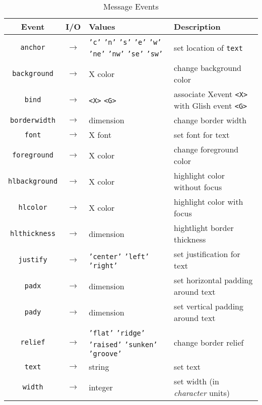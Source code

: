 \begin{table}[tbh]
{\small
\begin{center}
\begin{tabular}{|c|c|p{1.6in}|p{2.1in}|}
\hline
Event & I/O & Values & Description \\
\hline
\hline
{\tt anchor}    &$\rightarrow$& {\tt 'c'} {\tt 'n'} {\tt 's'} {\tt 'e'} {\tt 'w'} {\tt 'ne'} {\tt 'nw'} {\tt 'se'} {\tt 'sw'} & set location of {\tt text} \\ \hline
{\tt background}&$\rightarrow$& X color & change background color \\ \hline
{\tt bind}	&$\rightarrow$&\verb+<X>+ \verb+<G>+& associate Xevent \verb+<X>+ with Glish event \verb+<G>+ \\ \hline
{\tt borderwidth}&$\rightarrow$& dimension & change border width \\ \hline
{\tt font}	&$\rightarrow$& X font & set font for text \\ \hline
{\tt foreground}&$\rightarrow$& X color & change foreground color \\ \hline
{\tt hlbackground}&$\rightarrow$& X color & highlight color without focus \\ \hline
{\tt hlcolor}	&$\rightarrow$& X color & highlight color with focus \\ \hline
{\tt hlthickness}&$\rightarrow$& dimension & hightlight border thickness \\ \hline
{\tt justify}	&$\rightarrow$& {\tt 'center'} {\tt 'left'} {\tt 'right'} & set justification for text \\ \hline
{\tt padx}	&$\rightarrow$& dimension & set horizontal padding around text \\ \hline
{\tt pady}	&$\rightarrow$& dimension & set vertical padding around text \\ \hline
{\tt relief}	&$\rightarrow$& {\tt 'flat'} {\tt 'ridge'} {\tt 'raised'} {\tt 'sunken'} {\tt 'groove'} & change border relief \\ \hline
{\tt text}	&$\rightarrow$& string & set text \\ \hline
{\tt width}	&$\rightarrow$& integer & set width (in {\em character} units) \\ \hline
\end{tabular}
\end{center}
}
\caption{ Message Events }
\label{tkmessage-events}
\end{table}

